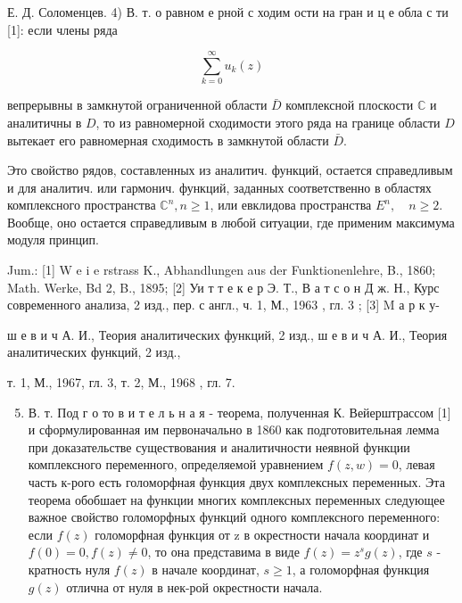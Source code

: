 \documentclass[10pt]{article}
\begin{document}
Е. Д. Соломенцев. 4) В. т. о равном е рной с ходим ости на гран и ц е обла с ти [1]: если члены ряда



\[

\sum_{k=0}^{\infty} u_{k}(z)

\]



вепрерывны в замкнутой ограниченной области $\bar{D}$ комплексной плоскости $\mathbb{C}$ и аналитичны в $D$, то из равномерной сходимости этого ряда на границе области $D$ вытекает его равномерная сходимость в замкнутой области $\bar{D}$.



Это свойство рядов, составленных из аналитич. функций, остается справедливым и для аналитич. или гармонич. функций, заданных соответственно в областях комплексного пространства $\mathbb{C}^{n}, n \geqslant 1$, или евклидова пространства $E^{n}, \quad n \geqslant 2$. Вообще, оно остается справедливым в любой ситуации, где применим максимума модуля принцип.



Jum.: [1] W e i e rstrass K., Abhandlungen aus der Funktionenlehre, B., 1860; Math. Werke, Bd 2, B., 1895; [2] Уи т т е к е р Э. Т., В а т с о н Д ж. Н., Курс современного анализа, 2 изд., пер. с англ., ч. 1, М., 1963 , гл. 3 ; [3] M а р к у-

ш е в и ч А. И., Теория аналитических функций, 2 изд., ш е в и ч А. И., Теория аналитических функций, 2 изд.,

т. 1, М., 1967, гл. 3, т. 2, М., 1968 , гл. 7.



\begin{enumerate}

  \setcounter{enumi}{4}

  \item В. т. Под г о то в и т е л ь н а я - теорема, полученная К. Вейерштрассом [1] и сформулированная им первоначально в 1860 как подготовительная лемма при доказательстве существования и аналитичности неявной функции комплексного переменного, определяемой уравнением $f(z, w)=0$, левая часть к-рого есть голоморфная функция двух комплексных переменных. Эта теорема обобшает на функции многих комплексных переменных следующее важное свойство голоморфных функций одного комплексного переменного: если $f(z)$ голоморфная функция от z в окрестности начала координат и $f(0)=0, f(z) \not=0$, то она представима в виде $f(z)=z^{s} g(z)$, где $s$ - кратность нуля $f(z)$ в начале координат, $s \geqslant 1$, а голоморфная функция $g(z)$ отлична от нуля в нек-рой окрестности начала.

\end{enumerate}
\end{document}
